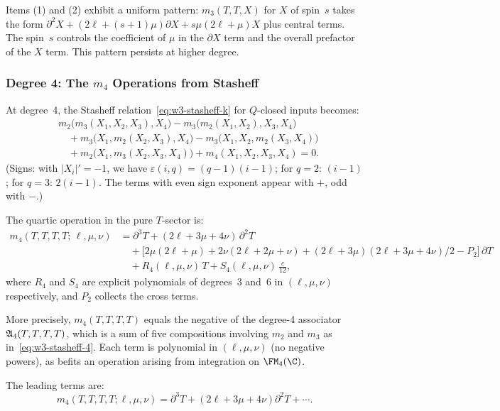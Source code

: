 \begin{remark}[Pattern in $m_3$]
\label{rem:m3-pattern}
Items (1) and (2) exhibit a uniform pattern: $m_3(T,T,X)$ for $X$ of
spin~$s$ takes the form $\partial^2 X + (2\ell + (s+1)\mu)\partial X + s\mu(2\ell + \mu) X$
plus central terms. The spin~$s$ controls the coefficient of $\mu$ in the
$\partial X$ term and the overall prefactor of the $X$ term.
This pattern persists at higher degree.
\end{remark}

\subsubsection{Degree 4: The $m_4$ Operations from Stasheff}

At degree~4, the Stasheff relation~\eqref{eq:w3-stasheff-k} for
$Q$-closed inputs becomes:
\begin{equation}
\label{eq:w3-stasheff-4}
\begin{split}
&m_2\bigl(m_3(X_1, X_2, X_3), X_4\bigr)
- m_3\bigl(m_2(X_1, X_2), X_3, X_4\bigr)\\
&\quad + m_3\bigl(X_1, m_2(X_2, X_3), X_4\bigr)
- m_3\bigl(X_1, X_2, m_2(X_3, X_4)\bigr)\\
&\quad + m_2\bigl(X_1, m_3(X_2, X_3, X_4)\bigr)
+ m_4(X_1, X_2, X_3, X_4) = 0.
\end{split}
\end{equation}
(Signs: with $|X_i|' = -1$, we have $\varepsilon(i,q) = (q-1)(i-1)$;
for $q=2$: $(i-1)$; for $q=3$: $2(i-1)$. The terms with even sign
exponent appear with $+$, odd with $-$.)

\begin{theorem}
\label{thm:w3-m4-TTTT}
The quartic operation in the pure $T$-sector is:
\begin{equation}
\label{eq:w3-m4-TTTT}
\boxed{
\begin{aligned}
m_4(T,T,T,T;\,\ell,\mu,\nu)
&= \partial^3 T
 + (2\ell + 3\mu + 4\nu)\,\partial^2 T\\
&\quad + \bigl[2\mu(2\ell+\mu) + 2\nu(2\ell+2\mu+\nu) + (2\ell+3\mu)(2\ell+3\mu+4\nu)/2 - P_2\bigr]\,\partial T\\
&\quad + R_4(\ell,\mu,\nu)\, T
 + S_4(\ell,\mu,\nu)\,\tfrac{c}{12},
\end{aligned}
}
\end{equation}
where $R_4$ and $S_4$ are explicit polynomials of degrees~$3$ and~$6$
in $(\ell,\mu,\nu)$ respectively, and $P_2$ collects the cross terms.

More precisely, $m_4(T,T,T,T)$ equals the negative of the degree-4
associator $\mathfrak{A}_4(T,T,T,T)$, which is a sum of five compositions
involving $m_2$ and $m_3$ as in~\eqref{eq:w3-stasheff-4}. Each term is
polynomial in $(\ell,\mu,\nu)$ (no negative powers), as befits an
operation arising from integration on $\FM_4(\C)$.

The leading terms are:
\begin{equation}
\label{eq:w3-m4-TTTT-leading}
m_4(T,T,T,T;\ell,\mu,\nu)
= \partial^3 T + (2\ell + 3\mu + 4\nu)\partial^2 T + \cdots.
\end{equation}
\end{theorem}

